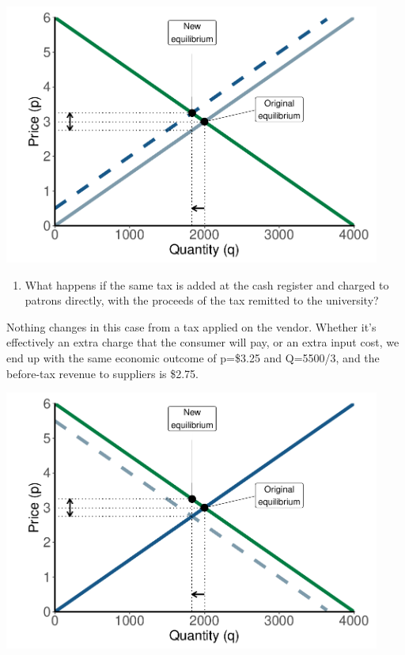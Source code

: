 \documentclass[11pt,]{article}
\providecommand{\tightlist}{%
  \setlength{\itemsep}{0pt}\setlength{\parskip}{0pt}}
\begin{document}
\begin{center}\includegraphics[width=468px]{week_3_problems_soln_files/figure-latex/q_2_graphs-1} \end{center}

\begin{enumerate}
\def\labelenumi{\alph{enumi})}
\setcounter{enumi}{1}
\tightlist
\item
  What happens if the same tax is added at the cash register and charged
  to patrons directly, with the proceeds of the tax remitted to the
  university?
\end{enumerate}

Nothing changes in this case from a tax applied on the vendor. Whether
it's effectively an extra charge that the consumer will pay, or an extra
input cost, we end up with the same economic outcome of p=\$3.25 and
Q=5500/3, and the before-tax revenue to suppliers is \$2.75.

\begin{center}\includegraphics[width=468px]{week_3_problems_soln_files/figure-latex/q_2_b_graphs-1} \end{center}
\end{document}
